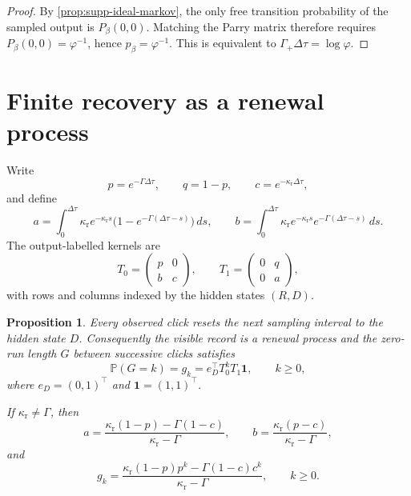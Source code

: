 \documentclass[11pt]{amsart}
\numberwithin{equation}{section}
\newtheorem{proposition}{Proposition}[section]
\theoremstyle{remark}
\newcommand{\PP}{\mathbb{P}}
\begin{document}
\begin{proof}
By \cref{prop:supp-ideal-markov}, the only free transition probability of the sampled output is $P_\beta(0,0)$. Matching the Parry matrix therefore requires $P_\beta(0,0)=\varphi^{-1}$, hence $p_\beta=\varphi^{-1}$. This is equivalent to $\Gamma_+\Delta\tau=\log\varphi$.
\end{proof}

\section{Finite recovery as a renewal process}\label{sec:supp-renewal}

Write
\[
p=e^{-\Gamma\Delta\tau},\qquad q=1-p,\qquad c=e^{-\kappa_{\mathrm r}\Delta\tau},
\]
and define
\begin{equation}\label{eq:supp-a-b}
a=\int_0^{\Delta\tau}\kappa_{\mathrm r}e^{-\kappa_{\mathrm r}s}\bigl(1-e^{-\Gamma(\Delta\tau-s)}\bigr)\,ds,
\qquad
b=\int_0^{\Delta\tau}\kappa_{\mathrm r}e^{-\kappa_{\mathrm r}s}e^{-\Gamma(\Delta\tau-s)}\,ds.
\end{equation}
The output-labelled kernels are
\begin{equation}\label{eq:supp-T0T1}
T_0=
\begin{pmatrix}
 p & 0 \\
 b & c
\end{pmatrix},
\qquad
T_1=
\begin{pmatrix}
 0 & q \\
 0 & a
\end{pmatrix},
\end{equation}
with rows and columns indexed by the hidden states $(R,D)$.

\begin{proposition}\label{prop:supp-renewal}
Every observed click resets the next sampling interval to the hidden state $D$. Consequently the visible record is a renewal process and the zero-run length $G$ between successive clicks satisfies
\begin{equation}\label{eq:supp-gap-law}
\PP(G=k)=g_k=e_D^{\top}T_0^kT_1\mathbf 1,\qquad k\ge0,
\end{equation}
where $e_D=(0,1)^{\top}$ and $\mathbf 1=(1,1)^{\top}$.

If $\kappa_{\mathrm r}\neq\Gamma$, then
\begin{equation}\label{eq:supp-a-b-closed}
a=\frac{\kappa_{\mathrm r}(1-p)-\Gamma(1-c)}{\kappa_{\mathrm r}-\Gamma},
\qquad
b=\frac{\kappa_{\mathrm r}(p-c)}{\kappa_{\mathrm r}-\Gamma},
\end{equation}
and
\begin{equation}\label{eq:supp-gap-closed}
g_k=
\frac{\kappa_{\mathrm r}(1-p)p^k-\Gamma(1-c)c^k}{\kappa_{\mathrm r}-\Gamma},
\qquad k\ge0.
\end{equation}
\end{proposition}
\end{document}
